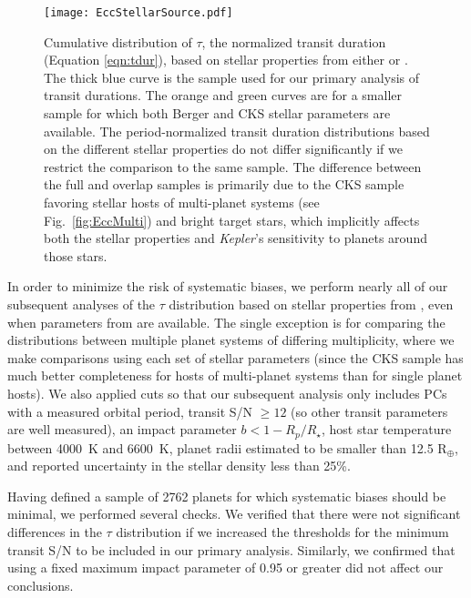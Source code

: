 \documentclass{aastex62}
\newcommand{\ikt}{{\it Kepler}}
\begin{document}
\begin{figure}
    \centering
    \texttt{[image: EccStellarSource.pdf]}
    \caption{Cumulative distribution of $\tau$, the normalized transit duration (Equation \ref{eqn:tdur}), based on stellar properties from either \citet{Berger:2020a} or \citet[][CKS]{Fulton:2018}.  
    The thick blue curve is the sample used for our primary analysis of transit durations.  
    The orange and green curves are for a smaller sample for which both Berger and CKS stellar parameters are available.  
    The period-normalized transit duration distributions based on the different stellar properties do not differ significantly if we restrict the comparison to the same sample. The difference between the full and overlap samples is primarily due to the CKS sample favoring stellar hosts of multi-planet systems (see Fig.~\ref{fig:EccMulti}) and bright target stars, which implicitly affects both the stellar properties and \ikt's sensitivity to planets around those stars.}
    \label{fig:EccStellarSource}
\end{figure}

In order to minimize the risk of systematic biases, we perform nearly all of our subsequent analyses of the $\tau$ distribution based on stellar properties from \citet{Berger:2020a}, even when parameters from \citet{Fulton:2018} are available. The single exception is for comparing the distributions between multiple planet systems of differing multiplicity, where we make comparisons using each set of stellar parameters (since the CKS sample has much better completeness for hosts of multi-planet systems than for single planet hosts).   We also applied cuts so that our subsequent analysis only includes PCs with a measured orbital period, transit S/N $\geq 12$ (so other transit parameters are well measured), an impact parameter $b < 1- R_p/R_\star$, host star temperature between 4000~K and 6600~K, planet radii estimated to be smaller than 12.5 R$_\oplus$, and reported uncertainty in the stellar density less than 25\%.   

Having defined a sample of 2762 planets for which systematic biases should be minimal, we performed several checks. We verified that there were not significant differences in the $\tau$ distribution if we increased the thresholds for the minimum transit S/N to be included in our primary analysis.  Similarly, we confirmed that using a fixed maximum impact parameter of 0.95 or greater did not affect our conclusions.  
\end{document}
